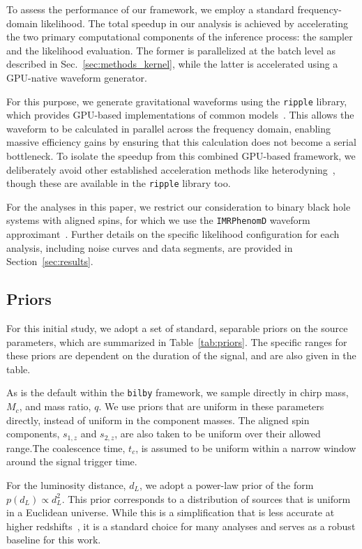\documentclass[fleqn,usenatbib]{mnras}
\begin{document}
To assess the performance of our framework, we employ a standard
frequency-domain likelihood. The total
speedup in our analysis is achieved by accelerating the two primary
computational components of the inference process: the sampler and the
likelihood evaluation. The former is parallelized at the batch level as
described in Sec.~\ref{sec:methods_kernel}, while the latter is
accelerated using a GPU-native waveform generator.

For this purpose, we generate gravitational waveforms using the
\texttt{ripple} library, which provides GPU-based implementations of
common models~\citep{ripple}. This allows the waveform to be calculated
in parallel across the frequency domain, enabling massive efficiency gains by 
ensuring that this calculation does not become a serial bottleneck.
To isolate the speedup from this combined GPU-based framework,
we deliberately avoid other established acceleration methods like 
heterodyning~\citep{TL_relativebinning, relativebinning2, relativebinning3, relativebinning4}, 
though these are available in the \texttt{ripple} library too.

For the analyses in this paper, we restrict our consideration to binary
black hole systems with aligned spins, for which we use the
\texttt{IMRPhenomD} waveform approximant~\citep{Khan:2015jqa}.
Further details on the specific likelihood configuration for each
analysis, including noise curves and data segments, are provided in Section~\ref{sec:results}.

\subsection{Priors}

For this initial study, we adopt a set of standard, separable priors on
the source parameters, which are summarized in Table~\ref{tab:priors}.
The specific ranges for these priors are dependent on the duration of the signal, and are
also given in the table.

As is the default within the \texttt{bilby} framework, we sample directly in chirp mass, $M_c$, and
mass ratio, $q$. We use priors that are uniform in these parameters directly, instead of uniform in the component masses. 
The aligned spin components, $s_{1,z}$ and $s_{2,z}$, are also taken to be uniform over
their allowed range.The coalescence time, $t_c$, is assumed to be uniform
within a narrow window around the signal trigger time.

For the luminosity distance, $d_L$, we adopt a power-law prior of the
form $p(d_L) \propto d_L^2$. This prior corresponds to a distribution of
sources that is uniform in a Euclidean universe. While this is a
simplification that is less accurate at higher redshifts~\citep{bilby_validation}, it is a
standard choice for many analyses and serves as a robust baseline for
this work.
\end{document}
